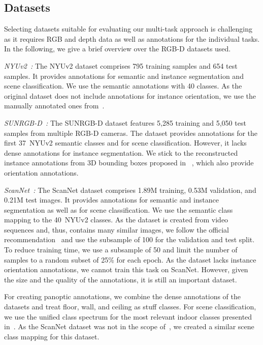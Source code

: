 \documentclass[conference]{IEEEtran}
\begin{document}
\subsection{Datasets}
\label{sec:experiments:datasets}
Selecting datasets suitable for evaluating our multi-task approach is challenging as it requires RGB and depth data as well as annotations for the individual tasks.
In the following, we give a brief overview over the RGB-D datasets used.

\textit{NYUv2~\cite{NYUv2-eccv2012}:} \enspace The NYUv2 dataset comprises 795 training samples and 654 test samples. 
It provides annotations for semantic and instance segmentation and scene classification.
We use the semantic annotations with 40 classes.
As the original dataset does not include annotations for instance orientation, we use the manually annotated ones from~\cite{emsanet2022ijcnn}.

\textit{SUNRGB-D~\cite{SUNRGBD-cvpr2015}:} \enspace The SUNRGB-D dataset features 5,285 training and 5,050 test samples from multiple RGB-D cameras.
The dataset provides annotations for the first 37~NYUv2 semantic classes and for scene classification. 
However, it lacks dense annotations for instance segmentation.
We stick to the reconstructed instance annotations from 3D bounding boxes proposed in ~\cite{emsanet2022ijcnn}, which also provide orientation annotations.

\textit{ScanNet~\cite{scannet-cvpr2017}:} \enspace The ScanNet dataset comprises 1.89M training, 0.53M validation, and 0.21M test images.
It provides annotations for semantic and instance segmentation as well as for scene classification. 
We use the semantic class mapping to the 40~NYUv2 classes.
As the dataset is created from video sequences and, thus, contains many similar images, we follow the official recommendation~\cite{scannet-cvpr2017} and use the subsample of 100 for the validation and test split.
To reduce training time, we use a subsample of 50 and limit the number of samples to a random subset of 25\% for each epoch.
As the dataset lacks instance orientation annotations, we cannot train this task on ScanNet.
However, given the size and the quality of the annotations, it is still an important dataset.

For creating panoptic annotations, we combine the dense annotations of the datasets and treat floor, wall, and ceiling as stuff classes.
For scene classification, we use the unified class spectrum for the most relevant indoor classes presented in~\cite{emsanet2022ijcnn}. 
As the ScanNet dataset was not in the scope of~\cite{emsanet2022ijcnn}, we created a similar scene class mapping for this dataset.
\end{document}

